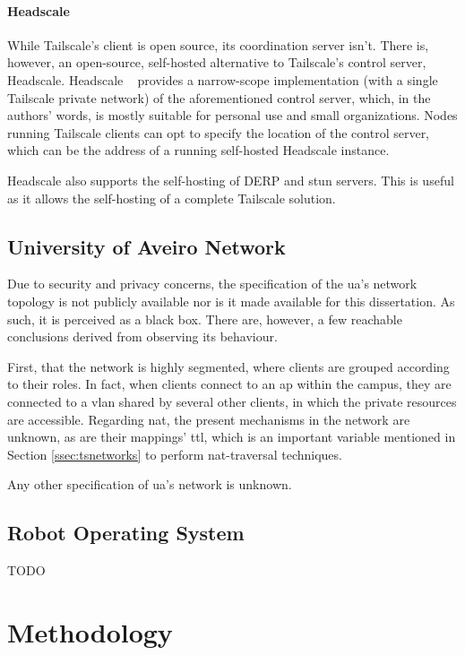 \documentclass[11pt,twoside,a4paper]{report}
\begin{document}
\subsubsection{Headscale}
\label{sec:hs}

While Tailscale's client is open source, its coordination server isn't. There is, however, an open-source, self-hosted alternative to Tailscale's control server, Headscale. Headscale ~\cite{headscale2023online} provides a narrow-scope implementation (with a single Tailscale private network) of the aforementioned control server, which, in the authors' words, is mostly suitable for personal use and small organizations. Nodes running Tailscale clients can opt to specify the location of the control server, which can be the address of a running self-hosted Headscale instance.

Headscale also supports the self-hosting of \ac{DERP} and \ac{stun} servers. This is useful as it allows the self-hosting of a complete Tailscale solution.

\section{University of Aveiro Network}
\label{sec:uanet}

Due to security and privacy concerns, the specification of the \ac{ua}'s network topology is not publicly available nor is it made available for this dissertation. As such, it is perceived as a black box. There are, however, a few reachable conclusions derived from observing its behaviour.

First, that the network is highly segmented, where clients are grouped according to their roles. In fact, when clients connect to an \ac{ap} within the campus, they are connected to a \ac{vlan} shared by several other clients, in which the private resources are accessible. Regarding \ac{nat}, the present mechanisms in the network are unknown, as are their mappings' \ac{ttl}, which is an important variable mentioned in Section \ref{ssec:tsnetworks} to perform \ac{nat}-traversal techniques.

Any other specification of \ac{ua}'s network is unknown.

\section{Robot Operating System}

TODO


\chapter{Methodology}
\label{chapter:method}
\end{document}
